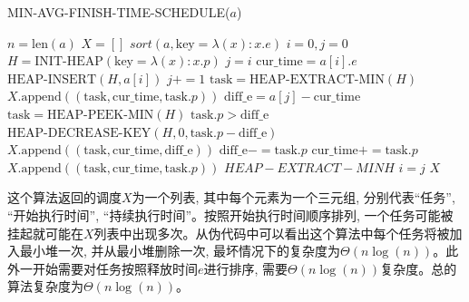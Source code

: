 \documentclass[paper=a4, fontsize=11pt]{scrartcl} %
\numberwithin{equation}{section} %
\numberwithin{figure}{section} %
\numberwithin{table}{section} %
\begin{document}
\begin{enumerate}[a]
  \begin{algorithm}[H]
    \caption{MIN-AVG-FINISH-TIME-SCHEDULE($a$)}
    \label{algo:1}
    \begin{algorithmic}
      \State $n = \mbox{len}(a)$
      \State $X = []$
      \State $sort(a, \mbox{key}=\lambda (x): x.e)$ 
      \State $i = 0, j = 0$
      \State $H = \mbox{INIT-HEAP}(\mbox{key}=\lambda (x): x.p)$ 
      \State $j = i$
      \State $\mbox{cur\_time} = a[i].e$
      \State $\mbox{HEAP-INSERT}(H, a[i])$ 
      \State $j+= 1$
      \EndWhile
      \State $\mbox{task} = \mbox{HEAP-EXTRACT-MIN}(H)$ 
      \State $X.\mbox{append}((\mbox{task}, \mbox{cur\_time}, \mbox{task}.p))$
      \EndWhile
      \State\Break
      \EndIf
      \State $\mbox{diff\_e} = a[j] - \mbox{cur\_time}$
      \State $\mbox{task} = \mbox{HEAP-PEEK-MIN}(H)$ 
      \If $\mbox{task}.p > \mbox{diff\_e}$
      \State $\mbox{HEAP-DECREASE-KEY}(H, 0, \mbox{task}.p - \mbox{diff\_e})$ 
      \State $X.\mbox{append}((\mbox{task}, \mbox{cur\_time}, \mbox{diff\_e}))$
      \State\Break
      \EndIf
      \State $\mbox{diff\_e} -= \mbox{task}.p$
      \State $\mbox{cur\_time} += \mbox{task}.p$
      \State $X.\mbox{append}((\mbox{task}, \mbox{cur\_time}, \mbox{task}.p))$
      \State $HEAP-EXTRACT-MIN{H}$ 
      \EndWhile
      \State $i = j$
      \EndWhile
      \State\Return $X$
    \end{algorithmic}
  \end{algorithm}

  这个算法返回的调度$X$为一个列表, 其中每个元素为一个三元组, 分别代表``任务'', ``开始执行时间'', ``持续执行时间''。按照开始执行时间顺序排列, 一个任务可能被挂起就可能在$X$列表中出现多次。从伪代码中可以看出这个算法中每个任务将被加入最小堆一次, 并从最小堆删除一次, 最坏情况下的复杂度为$\Theta(n\log(n))$。此外一开始需要对任务按照释放时间$e$进行排序, 需要$\Theta(n\log(n))$复杂度。总的算法复杂度为$\Theta(n\log(n))$。


\end{enumerate}
\end{document}
